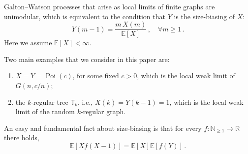 \documentclass[reqno,english]{amsart}
\numberwithin{equation}{section}
\theoremstyle{definition}{
\newtheorem{example}[theorem]{Example}
\newtheorem{definition}[theorem]{Definition}
\newtheorem*{definition*}{Definition}
\newtheorem{problem}[theorem]{Problem}
\newtheorem{question}[theorem]{Question}
}
\newcommand{\E}{\mathbb E}
\newcommand{\N}{\mathbb N}
\newcommand{\bbT}{\mathbb T}
\newcommand{\R}{\mathbb R}
\begin{document}
Galton--Watson processes that arise as local limits of finite graphs are unimodular, which is equivalent to the condition that $Y$ is the size-biasing of $X$:
\begin{equation}\label{eq:size_bias}
Y(m-1)=\frac{m\,X(m)}{\E[X]}\,,\quad\forall m\ge 1\,.
\end{equation}
Here we assume $\E[X]<\infty$.

Two main examples that we consider in this paper are:
\begin{enumerate}
    \item \(X=Y=\operatorname{Poi}(c)\), for some fixed \(c>0\), which is the
    local weak limit of \(G(n,c/n)\);
    \item the \(k\)-regular tree \(\bbT_k\), i.e.,
    \(X(k)=Y(k-1)=1\), which is the local weak limit of the random
    \(k\)-regular graph.
\end{enumerate}


An easy and fundamental fact about size-biasing is that for every $f:\N_{\ge 1}\to\R$ there holds,
\begin{equation}\label{eq:sizeBiasF}
\E[Xf(X-1)] = \E[X]\E[f(Y)]\,.
\end{equation}
\end{document}
